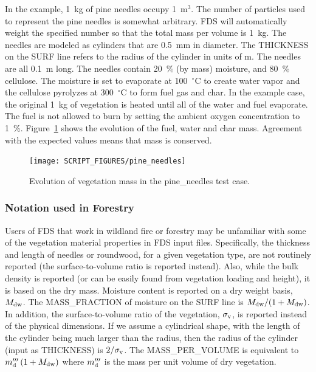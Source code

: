 \documentclass[11pt]{book}
\begin{document}
In the example, 1~kg of pine needles occupy 1~m$^3$. The number of particles used to represent the pine needles is somewhat arbitrary. FDS will automatically weight the specified number so that the total mass per volume is 1~kg. The needles are modeled as cylinders that are 0.5~mm in diameter. The {\ct THICKNESS} on the {\ct SURF} line refers to the radius of the cylinder in units of m. The needles are all 0.1~m long. The needles contain 20~\% (by mass) moisture, and 80~\% cellulose. The moisture is set to evaporate at 100~$^\circ$C to create water vapor and the cellulose pyrolyzes at 300~$^\circ$C to form fuel gas and char. In the example case, the original 1~kg of vegetation is heated until all of the water and fuel evaporate. The fuel is not allowed to burn by setting the ambient oxygen concentration to 1~\%. Figure~\ref{pine_needles_fig} shows the evolution of the fuel, water and char mass. Agreement with the expected values means that mass is conserved.

\begin{figure}[ht]
\begin{center}
\texttt{[image: SCRIPT\_FIGURES/pine\_needles]}
\end{center}
\caption[Example of burning vegetation]{Evolution of vegetation mass in the {\ct pine\_needles} test case.}
\label{pine_needles_fig}
\end{figure}

\subsubsection{Notation used in Forestry}

Users of FDS that work in wildland fire or forestry may be unfamiliar with some of the vegetation material properties in FDS input files. Specifically, the thickness and length of needles or roundwood, for a given vegetation type, are not routinely reported (the surface-to-volume ratio is reported instead). Also, while the bulk density is reported (or can be easily found from vegetation loading and height), it is based on the dry mass. Moisture content is reported on a dry weight basis, $M_{\rm dw}$. The {\ct MASS\_FRACTION} of moisture on the {\ct SURF} line is $M_{\rm dw} / (1 + M_{\rm dw})$. In addition, the surface-to-volume ratio of the vegetation, $\sigma_{\rm v}$, is reported instead of the physical dimensions. If we assume a cylindrical shape, with the length of the cylinder being much larger than the radius, then the radius of the cylinder (input as {\ct THICKNESS}) is $2/\sigma_{\rm v}$. The {\ct MASS\_PER\_VOLUME} is equivalent to $m_{\rm d}''' \, (1+M_{\rm dw})$ where $m_{\rm d}'''$ is the mass per unit volume of dry vegetation.
\end{document}
